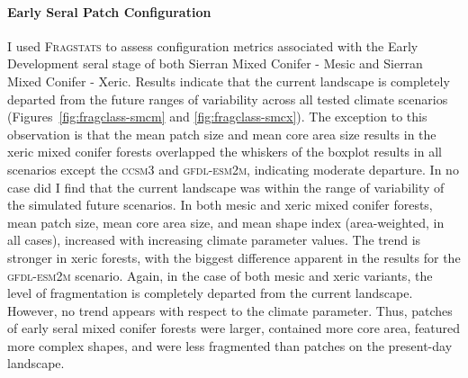 \paragraph*{Early Seral Patch Configuration}
I used \textsc{Fragstats} to assess configuration metrics associated with the Early Development seral stage of both Sierran Mixed Conifer - Mesic and Sierran Mixed Conifer - Xeric. Results indicate that the current landscape is completely departed from the future ranges of variability across all tested climate scenarios (Figures~\ref{fig:fragclass-smcm} and \ref{fig:fragclass-smcx}). The exception to this observation is that the mean patch size and mean core area size results in the xeric mixed conifer forests overlapped the whiskers of the boxplot results in all scenarios except the \textsc{ccsm3} and \textsc{gfdl-esm2m}, indicating moderate departure. In no case did I find that the current landscape was within the range of variability of the simulated future scenarios. In both mesic and xeric mixed conifer forests, mean patch size, mean core area size, and mean shape index (area-weighted, in all cases), increased with increasing climate parameter values. The trend is stronger in xeric forests, with the biggest difference apparent in the results for the \textsc{gfdl-esm2m} scenario. Again, in the case of both mesic and xeric variants, the level of fragmentation is completely departed from the current landscape. However, no trend appears with respect to the climate parameter. Thus, patches of early seral mixed conifer forests were larger, contained more core area, featured more complex shapes, and were less fragmented than patches on the present-day landscape.


